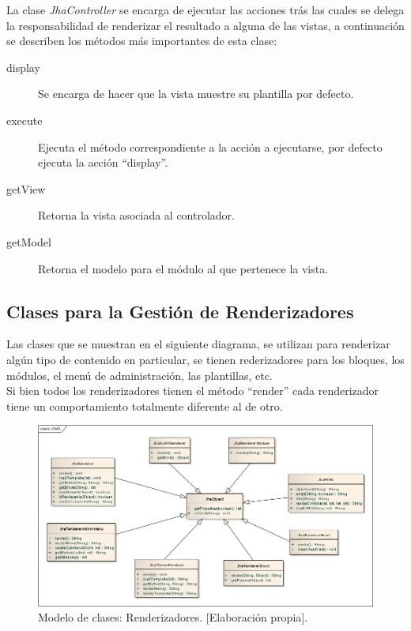 

La clase \emph{JhaController} se encarga de ejecutar las acciones tr\'as las cuales se delega la responsabilidad de renderizar el resultado a alguna de las vistas, a continuaci\'on se describen los m\'etodos m\'as importantes de esta clase:
\begin{description}
\item[display] Se encarga de hacer que la vista muestre su plantilla por defecto.
\item[execute] Ejecuta el m\'etodo correspondiente a la acci\'on a ejecutarse, por defecto ejecuta la acci\'on ``display''.
\item[getView] Retorna la vista asociada al controlador.
\item[getModel] Retorna el modelo para el m\'odulo al que pertenece la vista.
\end{description}



\newpage
\subsection{Clases para la Gesti\'on de Renderizadores}
Las clases que se muestran en el siguiente diagrama, se utilizan para renderizar alg\'un tipo de contenido en particular, se tienen rederizadores para los bloques, los m\'odulos, el men\'u de administraci\'on, las plantillas, etc.\\
Si bien todos los renderizadores tienen el m\'etodo ``render'' cada renderizador tiene un comportamiento totalmente diferente al de otro.

\begin{figure}[h]
\centering
\includegraphics[scale=.45, keepaspectratio=true]{imagenes/10_imagen.png}
\caption{Modelo de clases: Renderizadores. [Elaboraci\'on propia].}
\end{figure}

